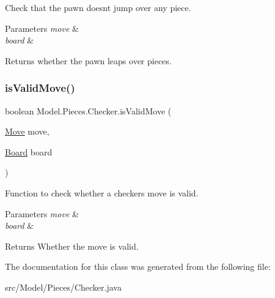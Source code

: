 Check that the pawn doesn\textquotesingle{}t jump over any piece. 
\begin{DoxyParams}{Parameters}
{\em move} & \\
\hline
{\em board} & \\
\hline
\end{DoxyParams}
\begin{DoxyReturn}{Returns}
whether the pawn leaps over pieces. 
\end{DoxyReturn}
\hypertarget{class_model_1_1_pieces_1_1_checker_a833ad4dc58dc068f194b30c5eb989d52}{}\label{class_model_1_1_pieces_1_1_checker_a833ad4dc58dc068f194b30c5eb989d52} 
\subsubsection{\texorpdfstring{is\+Valid\+Move()}{isValidMove()}}
{\footnotesize\ttfamily boolean Model.\+Pieces.\+Checker.\+is\+Valid\+Move (\begin{DoxyParamCaption}\item[{\hyperlink{class_model_1_1_move}{Move}}]{move,  }\item[{\hyperlink{class_model_1_1_board}{Board}}]{board }\end{DoxyParamCaption})}

Function to check whether a checker\textquotesingle{}s move is valid. 
\begin{DoxyParams}{Parameters}
{\em move} & \\
\hline
{\em board} & \\
\hline
\end{DoxyParams}
\begin{DoxyReturn}{Returns}
Whether the move is valid. 
\end{DoxyReturn}


The documentation for this class was generated from the following file\+:\begin{DoxyCompactItemize}
\item 
src/\+Model/\+Pieces/Checker.\+java\end{DoxyCompactItemize}
